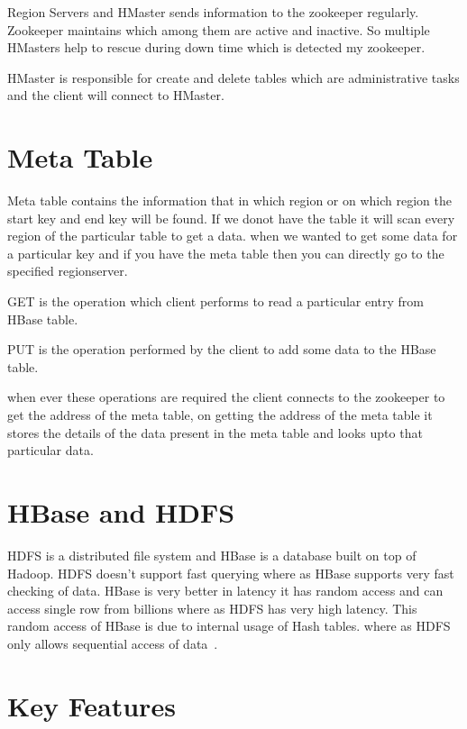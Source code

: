  Region Servers and HMaster sends information to the zookeeper regularly. 
Zookeeper maintains which among them are active and inactive. So multiple 
HMasters help to rescue during down time which is detected my zookeeper. 

 HMaster is responsible for create and delete tables which are administrative 
 tasks and the client will connect to HMaster.

 \section{Meta Table} Meta table contains the information that in which region
or on which region the start key and end key will be found. If we donot have the
table it will scan every region of the particular table to get a data. when we
wanted to get some data for a particular key and if you have the meta table then
you can directly go to the specified regionserver.

 \begin{description}

 \item GET is the operation which client performs to read a particular entry
from   HBase table.

\item PUT is the operation performed by the client to add some data to the HBase
table.

\end{description}
 when ever these operations are required the client connects to the zookeeper to
 get the address of the meta table, on getting the address of the meta table it 
 stores the details of the data present in the meta table and looks upto that 
 particular data. 

\section{HBase and HDFS}
HDFS is a distributed file system and HBase is a database built on top of Hadoop.
HDFS doesn't support fast querying where as HBase supports very fast checking of 
data. HBase is very better in latency it has random access and can access single 
row from billions where as HDFS has very high latency. This random access of 
HBase is due to internal usage of Hash tables.  where as HDFS only allows 
sequential access of data~\cite{hid-sp18-421-HBase-HDFS}.
\section{Key Features}

